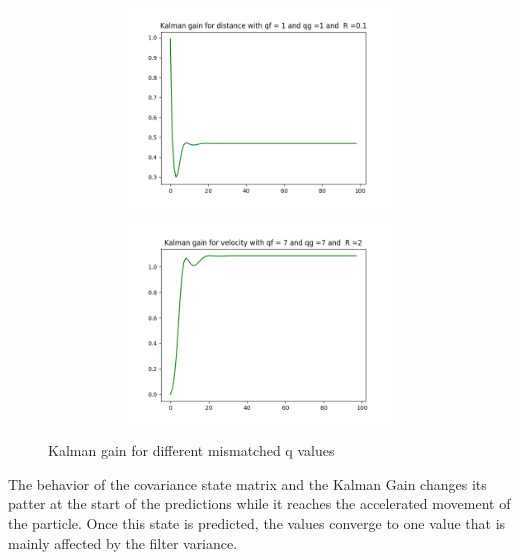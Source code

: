 \documentclass{article}
\begin{document}
        \begin{figure}[H]
            \centering 
            \begin{subfigure}{1\textwidth}  
                \begin{subfigure}{.5\textwidth}  
                    \centering 
                    \includegraphics[width=.7\linewidth]{./img/acc/K11_qf1_qg1_r01.png}
                    \caption{}
                \end{subfigure}
                \begin{subfigure}{.5\textwidth}  
                    \centering 
                    \includegraphics[width=.7\linewidth]{./img/acc/K22_qf7_qg7_r2.png}
                    \caption{ }
                \end{subfigure}                
            \end{subfigure}
            \caption{Kalman gain for different mismatched q values}
            \label{fig:accmatp}
        \end{figure}

        The behavior of the covariance state matrix and the Kalman Gain changes its patter at the start of the predictions
        while it reaches the accelerated movement of the particle. Once this state is predicted, the values converge to one
        value that is mainly affected by the filter variance.
\end{document}
